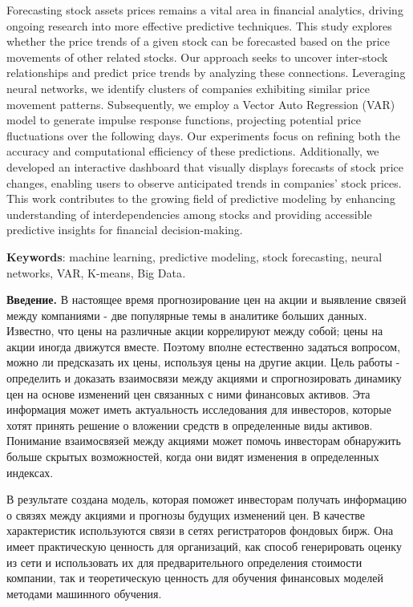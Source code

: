 {Forecasting stock assets prices remains a vital area in financial
analytics, driving ongoing research into more effective predictive
techniques. This study explores whether the price trends of a given
stock can be forecasted based on the price movements of other related
stocks. Our approach seeks to uncover inter-stock relationships and
predict price trends by analyzing these connections. Leveraging neural
networks, we identify clusters of companies exhibiting similar price
movement patterns. Subsequently, we employ a Vector Auto Regression
(VAR) model to generate impulse response functions, projecting potential
price fluctuations over the following days. Our experiments focus on
refining both the accuracy and computational efficiency of these
predictions. Additionally, we developed an interactive dashboard that
visually displays forecasts of stock price changes, enabling users to
observe anticipated trends in companies' stock prices. This work
contributes to the growing field of predictive modeling by enhancing
understanding of interdependencies among stocks and providing accessible
predictive insights for financial decision-making.

{\bfseries Keywords}: machine learning, predictive modeling, stock
forecasting, neural networks, VAR, K-means, Big Data\emph{.}

{\bfseries Введение.} В настоящее время прогнозирование цен на акции и
выявление связей между компаниями - две популярные темы в аналитике
больших данных. Известно, что цены на различные акции коррелируют между
собой; цены на акции иногда движутся вместе. Поэтому вполне естественно
задаться вопросом, можно ли предсказать их цены, используя цены на
другие акции. Цель работы - определить и доказать взаимосвязи между
акциями и спрогнозировать динамику цен на основе изменений цен связанных
с ними финансовых активов. Эта информация может иметь актуальность
исследования для инвесторов, которые хотят принять решение о вложении
средств в определенные виды активов. Понимание взаимосвязей между
акциями может помочь инвесторам обнаружить больше скрытых возможностей,
когда они видят изменения в определенных индексах.

В результате создана модель, которая поможет инвесторам получать
информацию о связях между акциями и прогнозы будущих изменений цен. В
качестве характеристик используются связи в сетях регистраторов фондовых
бирж. Она имеет практическую ценность для организаций, как способ
генерировать оценку из сети и использовать их для предварительного
определения стоимости компании, так и теоретическую ценность для
обучения финансовых моделей методами машинного обучения.

}
